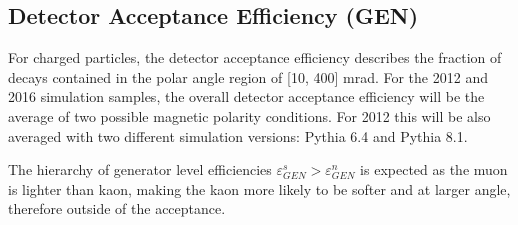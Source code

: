 

\subsection{Detector Acceptance Efficiency (GEN)}
For charged particles, the detector acceptance efficiency describes the fraction of decays contained in the polar angle region of [10, 400] mrad.  
For the 2012 and 2016 simulation samples, the overall detector acceptance efficiency will be the average of two possible magnetic polarity conditions. For 2012 this will be also averaged with two different simulation versions: Pythia 6.4\cite{pythia6} and Pythia 8.1\cite{pythia8}.

The hierarchy of generator level efficiencies $\varepsilon^{s}_{GEN} > \varepsilon^{n}_{GEN}$ is expected as the muon is lighter than kaon, making the kaon more likely to be softer and at larger angle, therefore outside of the acceptance. 

